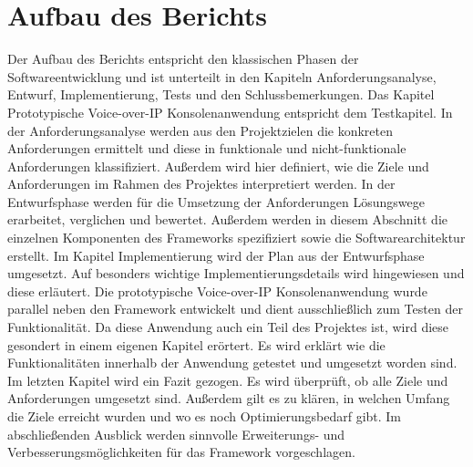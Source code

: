 \section{Aufbau des Berichts}
Der Aufbau des Berichts entspricht den klassischen Phasen der Softwareentwicklung und ist unterteilt in den Kapiteln Anforderungsanalyse, Entwurf, Implementierung, Tests und den Schlussbemerkungen. Das Kapitel Prototypische Voice-over-IP Konsolenanwendung entspricht dem Testkapitel. 
In der Anforderungsanalyse werden aus den Projektzielen die konkreten Anforderungen ermittelt und diese in funktionale und nicht-funktionale Anforderungen klassifiziert. Außerdem wird hier definiert, wie die Ziele und Anforderungen im Rahmen des Projektes interpretiert werden.
In der Entwurfsphase werden für die Umsetzung der Anforderungen Lösungswege erarbeitet, verglichen und bewertet. Außerdem werden in diesem Abschnitt die einzelnen Komponenten des Frameworks spezifiziert sowie die Softwarearchitektur erstellt.
Im Kapitel Implementierung wird der Plan aus der Entwurfsphase umgesetzt. Auf besonders wichtige Implementierungsdetails wird hingewiesen und diese erläutert. 
Die prototypische Voice-over-IP Konsolenanwendung wurde parallel neben den Framework entwickelt und dient ausschließlich zum Testen der Funktionalität. Da diese Anwendung auch ein Teil des Projektes ist, wird diese gesondert in einem eigenen Kapitel erörtert. Es wird erklärt wie die Funktionalitäten innerhalb der Anwendung getestet und umgesetzt worden sind.
Im letzten Kapitel wird ein Fazit gezogen. Es wird überprüft, ob alle Ziele und Anforderungen umgesetzt sind. Außerdem gilt es zu klären, in welchen Umfang die Ziele erreicht wurden und wo es noch Optimierungsbedarf gibt. Im abschließenden Ausblick werden sinnvolle Erweiterungs- und Verbesserungsmöglichkeiten für das Framework vorgeschlagen.
	
